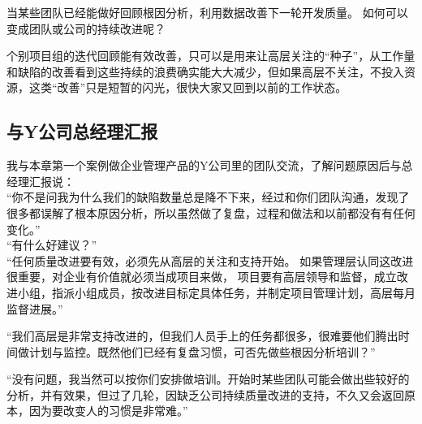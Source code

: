 \documentclass{book}        %
\begin{document}
当某些团队已经能做好回顾根因分析，利用数据改善下一轮开发质量。
如何可以变成团队或公司的持续改进呢？



个别项目组的迭代回顾能有效改善，只可以是用来让高层关注的``种子''，从工作量和缺陷的改善看到这些持续的浪费确实能大大减少，但如果高层不关注，不投入资源，这类``改善''只是短暂的闪光，很快大家又回到以前的工作状态。

\hypertarget{ux4e0eyux516cux53f8ux603bux7ecfux7406ux6c47ux62a5}{%
\subsection{与Y公司总经理汇报}\label{ux4e0eyux516cux53f8ux603bux7ecfux7406ux6c47ux62a5}}

我与本章第一个案例做企业管理产品的Y公司里的团队交流，了解问题原因后与总经理汇报说：\\
``你不是问我为什么我们的缺陷数量总是降不下来，经过和你们团队沟通，发现了很多都误解了根本原因分析，所以虽然做了复盘，过程和做法和以前都没有有任何变化。''\\
``有什么好建议？''\\
``任何质量改进要有效，必须先从高层的关注和支持开始。
如果管理层认同这改进很重要，对企业有价值就必须当成项目来做，
项目要有高层领导和监督，成立改进小组，指派小组成员，按改进目标定具体任务，并制定项目管理计划，高层每月监督进展。''

``我们高层是非常支持改进的，但我们人员手上的任务都很多，很难要他们腾出时间做计划与监控。既然他们已经有复盘习惯，可否先做些根因分析培训？''

``没有问题，我当然可以按你们安排做培训。开始时某些团队可能会做出些较好的分析，并有效果，但过了几轮，因缺乏公司持续质量改进的支持，不久又会返回原本，因为要改变人的习惯是非常难。''
\end{document}
